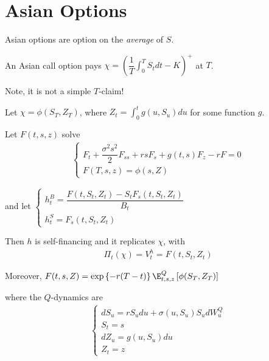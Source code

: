 \section{Asian Options}
Asian options are option on the \textit{average} of $S$.\par

\noindent An Asian call option pays $\chi = \left(\dfrac{1}{T}\int_{0}^{T}S_tdt-K\right)^+$ at $T$.\par
\noindent Note, it is not a simple $T$-claim!
\par\bigskip
\begin{theo}[]{}
  Let $\chi = \phi(S_T,Z_T)$, where $Z_t = \int_{0}^{t}g(u,S_u)du$ for some function $g$.\par
  \noindent Let $F(t,s,z)$ solve
  \begin{equation*}
    \begin{gathered}
      \begin{cases}
        F_t+\dfrac{\sigma^2 s^2}{2}F_{ss}+rsF_s + g(t,s)F_z -rF=0\\
        F(T,s,z) = \phi(s,Z)
      \end{cases}
    \end{gathered}
  \end{equation*}
  \par\bigskip
  \noindent and let $\begin{cases}
    h_t^B = \dfrac{F(t,S_t,Z_t)-S_tF_s(t,S_t,Z_t)}{B_t}\\
    h_t^S = F_s(t,S_t,Z_t)
  \end{cases}$\par
  \noindent Then $h$ is self-financing and it replicates $\chi$, with 
  \begin{equation*}
    \begin{gathered}
      \Pi_t(\chi) = V_t^h = F(t,S_t,Z_t)
    \end{gathered}
  \end{equation*}\par
  \noindent Moreover, $F(t,s,Z) = \text{exp}\left\{-r(T-t)\right\}\E_{t,s,z}^Q\left[\phi(S_T,Z_T)\right]$\par
  \noindent where the $Q$-dynamics are
  \begin{equation*}
    \begin{gathered}
      \begin{cases}
        dS_u = rS_udu+\sigma(u,S_u)S_udW_u^Q\\
        S_t = s\\
        dZ_u = g(u,S_u)du\\
        Z_t = z
      \end{cases}
    \end{gathered}
  \end{equation*}
\end{theo}
